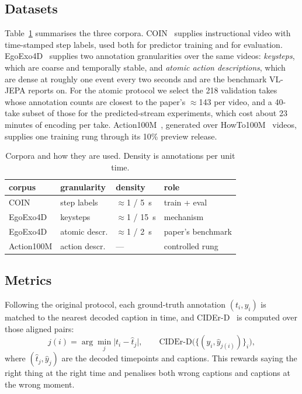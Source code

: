 \documentclass[journal]{IEEEtran}
\begin{document}
\subsection{Datasets}
Table~\ref{tab:data} summarises the three corpora. COIN~\cite{coin2019} supplies
instructional video with time-stamped step labels, used both for predictor
training and for evaluation. EgoExo4D~\cite{egoexo4d2024} supplies two annotation
granularities over the same videos: \emph{keysteps}, which are coarse and
temporally stable, and \emph{atomic action descriptions}, which are dense at
roughly one event every two seconds and are the benchmark VL-JEPA reports on. For
the atomic protocol we select the 218 validation takes whose annotation counts
are closest to the paper's $\approx$143 per video, and a 40-take subset of those
for the predicted-stream experiments, which cost about 23 minutes of encoding per
take. Action100M~\cite{action100m2026}, generated over
HowTo100M~\cite{howto100m2019} videos, supplies one training rung through its
10\% preview release.

\begin{table}[t]
\caption{Corpora and how they are used. Density is annotations per unit time.}
\label{tab:data}
\centering
\footnotesize
\setlength{\tabcolsep}{3pt}
\begin{tabular}{llll}
\toprule
corpus & granularity & density & role \\
\midrule
COIN & step labels & $\approx$1 / 5~s & train + eval \\
EgoExo4D & keysteps & $\approx$1 / 15~s & mechanism \\
EgoExo4D & atomic descr. & $\approx$1 / 2~s & paper's benchmark \\
Action100M & action descr. & --- & controlled rung \\
\bottomrule
\end{tabular}
\end{table}

\subsection{Metrics}
Following the original protocol, each ground-truth annotation $(t_i, y_i)$ is
matched to the nearest decoded caption in time, and CIDEr-D~\cite{cider2015} is
computed over those aligned pairs:
\begin{equation}
j(i) = \arg\min_{j} \lvert t_i - \hat{t}_j \rvert, \qquad
\text{CIDEr-D}\big(\{(y_i, \hat{y}_{j(i)})\}_i\big),
\end{equation}
where $(\hat{t}_j, \hat{y}_j)$ are the decoded timepoints and captions. This
rewards saying the right thing at the right time and penalises both wrong captions
and captions at the wrong moment.
\end{document}

